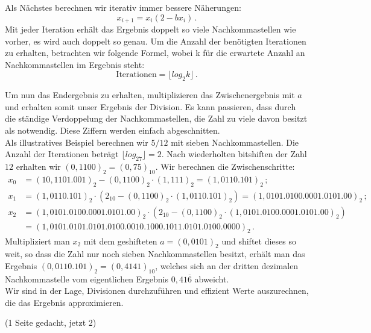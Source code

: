 \documentclass[course=erap]{aspdoc}
\begin{document}
Als Nächstes berechnen wir iterativ immer bessere Näherungen:
\begin{equation} \label{eq:iterationen}
  x_{i + 1} = x_i (2 - b x_i) \, .
\end{equation}
Mit jeder Iteration erhält das Ergebnis doppelt so viele Nachkommastellen wie vorher, es wird auch doppelt so genau. Um die Anzahl der benötigten Iterationen zu erhalten, betrachten wir folgende Formel, wobei k für die erwartete Anzahl an Nachkommastellen im Ergebnis steht:
\begin{equation} \label{eq:anzahl_iterationen}
  \text{Iterationen} = \lfloor log_2k\rfloor \, .
\end{equation}

Um nun das Endergebnis zu erhalten, multiplizieren das Zwischenergebnis mit $a$ und erhalten somit unser Ergebnis der Division.
Es kann passieren, dass durch die ständige Verdoppelung der Nachkommastellen, die Zahl zu viele davon besitzt als notwendig. Diese Ziffern werden einfach abgeschnitten. \\
Als illustratives Beispiel berechnen wir $5 / 12$ mit sieben Nachkommastellen. Die Anzahl der Iterationen beträgt $ \lfloor log_27\rfloor = 2$.
Nach wiederholten bitshiften der Zahl $12$ erhalten wir $(0,1100)_2 = (0,75)_{10}$. Wir berechnen die Zwischenschritte:
\begin{align}
  x_0 &= (10,1101.001)_2 - (0,1100)_2 \cdot (1,111)_2 = (1,0110.101)_2 \,; \label{eq:beispiel_x0} \nonumber \\ 
  x_1 &= (1,0110.101)_2 \cdot (2_{10} - (0,1100)_2 \cdot (1,0110.101)_2) = (1,0101.0100.0001.0101.00)_2  \,; \label{eq:beispiel_x1} \nonumber \\
  x_2 &= (1,0101.0100.0001.0101.00)_2 \cdot (2_{10} - (0,1100)_2 \cdot (1,0101.0100.0001.0101.00)_2) \nonumber \\ 
      &= (1,0101.0101.0101.0100.0010.1000.1011.0101.0100.0000)_2 \,. \label{eq:beispiel_x2} \nonumber
\end{align}
Multipliziert man $x_2$ mit dem geshifteten $a = (0,0101)_2$ und shiftet dieses so weit, so dass die Zahl nur noch sieben Nachkommastellen besitzt, erhält man das
Ergebnis $(0,0110.101)_2 = (0,4141)_{10}$, welches sich an der dritten dezimalen Nachkommastelle vom eigentlichen Ergebnis $0,41\overline{6}$ abweicht. \\

Wir sind in der Lage, Divisionen durchzuführen und effizient Werte auszurechnen, die das Ergebnis approximieren.

(1 Seite gedacht, jetzt 2)
\end{document}
